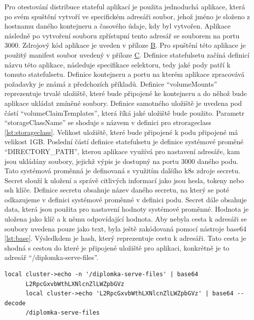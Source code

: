 \par
      Pro otestování distribuce stateful aplikací je použita jednoduchá aplikace, která po svém spuštění vytvoří ve specifickém adresáři soubor, jehož jméno je složeno z hostnamu daného kontejneru a časového údaje, kdy byl vytvořen. Aplikace následně po vytvoření souboru zpřístupní tento adresář se souborem na portu 3000. Zdrojový kód aplikace je uveden v příloze \hyperref[app:servefiles]{B}. Pro spuštění této aplikace je použitý manifest soubor uvedený v příloze \hyperref[app:statefulset]{C}. Definice statefulsetu začíná definicí názvu této aplikace, následuje specifikace selektoru, tedy jaké pody patří k tomuto statefulsetu. Definice kontejneru a portu na kterém aplikace zpracovává požadavky je známá z předchozích příkladů. Definice “volumeMounts” reprezentuje trvalé uložiště, které bude připojené ke kontejneru a do něhož bude aplikace ukládat zmíněné soubory. Definice samotného uložiště je uvedena pod částí “volumeClaimTemplates”, která říká jaké uložiště bude použito. Parametr “storageClassName” se shoduje s názvem v definici pro strorageclass \ref{lst:storageclass}. Velikost uložiště, které bude připojené k podu připojené má velikost 1GB. Poslední částí definice statefulsetu je definice systémové proměné “DIRECTORY\_PATH”, kterou aplikace využívá pro nastavení adresáře, kam jsou ukládány soubory, jejichž výpis je dostupný na portu 3000 daného podu. Tato systémová proměnná je definovaná s využitím dalšího k8s zdroje secretu. Secret slouží k uložení a správě citlivých informací jako jsou hesla, tokeny nebo ssh klíče. Definice secretu obsahuje název daného secretu, na který se poté odkazujeme v definici systémové proměnné v definici podu. Secret dále obsahuje data, která jsou použita pro nastavení hodnoty systémové proměnné. Hodnota je uložena jako klíč a k němu odpovídající hodnota. Aby nebyla cesta k adresáři se soubory uvedena pouze jako text, byla ještě zakódovaná pomocí nástroje base64 \ref{lst:base}. Výsledkdem je hash, který reprezentuje cestu k adresáři. Tato cesta je shodná s cestou do které je připojené uložiště pro aplikaci, konkrétně je to adresář “/diplomka-serve-files”.

\begin{lstlisting}[caption={Zakódování textu pomocí base64 nástroje},label=lst:base]
      local cluster->echo -n '/diplomka-serve-files' | base64
      L2RpcGxvbWthLXNlcnZlLWZpbGVz
      local cluster->echo 'L2RpcGxvbWthLXNlcnZlLWZpbGVz' | base64 --decode
      /diplomka-serve-files
\end{lstlisting}

